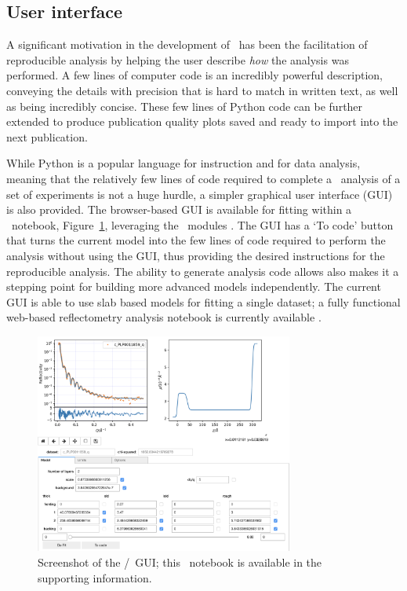 \documentclass[pdf,preprint]{iucr}
\begin{document}
\subsection{User interface}

A significant motivation in the development of \ has been the facilitation of reproducible analysis by helping the user describe \emph{how} the analysis was performed. A few lines of computer code is an incredibly powerful description, conveying the details with precision that is hard to match in written text, as well as being incredibly concise.
These few lines of Python code can be further extended to produce publication quality plots saved and ready to import into the next publication.

While Python is a popular language for instruction and for data analysis, meaning that the relatively few lines of code required to complete a \ analysis of a set of experiments is not a huge hurdle, a simpler graphical user interface (GUI) is also provided.
The browser-based GUI is available for fitting within a \Jupyter\ notebook, Figure~\ref{fig:gui}, leveraging the \ipywidgets\ modules \cite{ipywidgets}. The GUI has a `To code' button that turns the current model into the few lines of code required to perform the analysis without using the GUI, thus providing the desired instructions for the reproducible analysis. The ability to generate analysis code allows also makes it a stepping point for building more advanced models independently.
The current GUI is able to use slab based models for fitting a single dataset; a fully functional web-based reflectometry analysis notebook is currently available \cite{Nelson2018}.

\begin{figure}
  \includegraphics[width=85mm]{./supporting_information/gui.png}
  \caption{Screenshot of the \Jupyter/\ipywidgets\ GUI; this \Jupyter\ notebook is available in the supporting information.}
  \label{fig:gui}
\end{figure}
\end{document}
